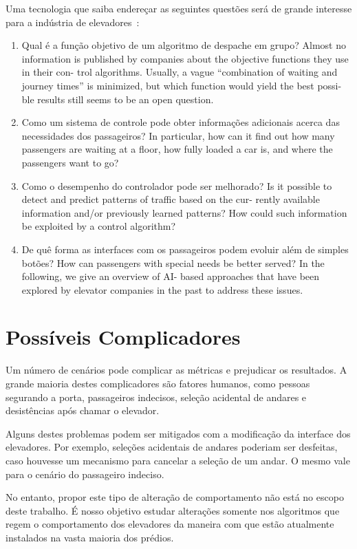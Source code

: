 Uma tecnologia que saiba endereçar as seguintes questões será de grande interesse para a indústria de elevadores~\cite{KOEHLEROTTIGER02}:

\begin{enumerate}
\item Qual é a função objetivo de um algoritmo de despache em grupo? \hfill \newline
      Almost no information is published by companies about the objective functions they use in their con- trol algorithms. Usually, a vague “combination of waiting and journey times” is minimized, but which function would yield the best possi- ble results still seems to be an open question.

\item Como um sistema de controle pode obter informações adicionais acerca das necessidades dos passageiros?\hfill \newline
      In particular, how can it find out how many passengers are waiting at a floor, how fully loaded a car is, and where the passengers want to go?

\item Como o desempenho do controlador pode ser melhorado? \hfill \newline
      Is it possible to detect and predict patterns of traffic based on the cur- rently available information and/or previously learned patterns? How could such information be exploited by a control algorithm?

\item De quê forma as interfaces com os passageiros podem evoluir além de simples botões? \hfill \newline
      How can passengers with special needs be better served? In the following, we give an overview of AI- based approaches that have been explored by elevator companies in the past to address these issues.
\end{enumerate}

\section{Possíveis Complicadores}

Um número de cenários pode complicar as métricas e prejudicar os resultados. A grande maioria destes complicadores são fatores humanos, como pessoas segurando a porta, passageiros indecisos, seleção acidental de andares e desistências após chamar o elevador.

Alguns destes problemas podem ser mitigados com a modificação da interface dos elevadores. Por exemplo, seleções acidentais de andares poderiam ser desfeitas, caso houvesse um mecanismo para cancelar a seleção de um andar. O mesmo vale para o cenário do passageiro indeciso.

No entanto, propor este tipo de alteração de comportamento não está no escopo deste trabalho. É nosso objetivo estudar alterações somente nos algoritmos que regem o comportamento dos elevadores da maneira com que estão atualmente instalados na vasta maioria dos prédios.